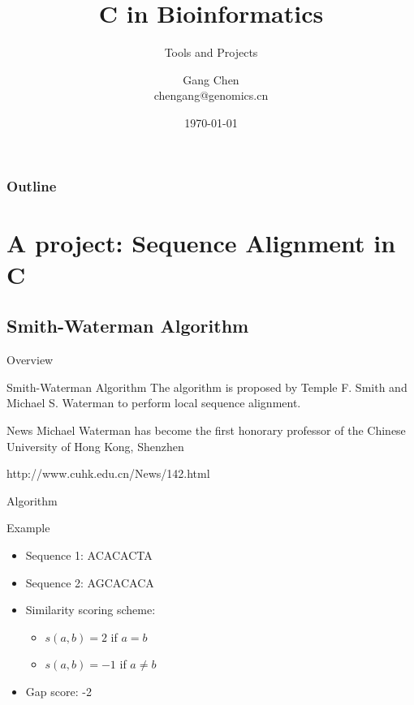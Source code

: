 \documentclass[UTF8]{beamer}
\title{C in Bioinformatics}
\subtitle{Tools and Projects}
\author{Gang Chen\\ chengang@genomics.cn}
\date{\today}
\begin{document}
\begin{frame}
\titlepage
\end{frame}
\begin{frame}[t]\frametitle{Outline}
\tableofcontents[hideallsubsections]
\end{frame}

\section{A project: Sequence Alignment in C}

\subsection{Smith-Waterman Algorithm}
\begin{frame}[t]{Overview}
\begin{block}{Smith-Waterman Algorithm}
  The algorithm is proposed by Temple F. Smith and Michael S. Waterman to
  perform local sequence alignment.
\end{block}

\begin{block}{News}
  Michael Waterman has become the first honorary professor of the Chinese
  University of Hong Kong, Shenzhen

  http://www.cuhk.edu.cn/News/142.html
\end{block}

\end{frame}

\begin{frame}[t]{Algorithm}
\begin{block}{Example}
    \begin{itemize}
        \item Sequence 1: ACACACTA
        \item Sequence 2: AGCACACA
        \item Similarity scoring scheme:
        \begin{itemize}
            \item $s(a, b) = 2$ if $a = b$
            \item $s(a, b) = -1$ if $a \neq b$
        \end{itemize}
        \item Gap score: -2
    \end{itemize}
\end{block}
\end{frame}
\end{document}
